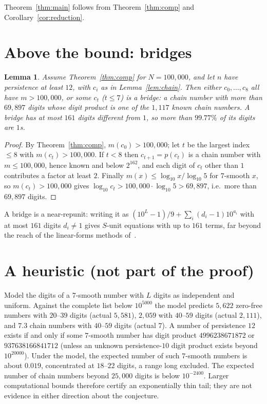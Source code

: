 \documentclass[11pt]{article}
\newtheorem{lemma}[theorem]{Lemma}
\theoremstyle{definition}
\newcommand{\NB}{100{,}000}
\begin{document}
Theorem~\ref{thm:main} follows from Theorem~\ref{thm:comp} and Corollary~\ref{cor:reduction}.

\section{Above the bound: bridges}\label{sec:bridges}

\begin{lemma}\label{lem:bridge}
Assume Theorem~\ref{thm:comp} for $N=\NB$, and let $n$ have persistence at least $12$, with $c_i$ as in
Lemma~\ref{lem:chain}. Then either $c_0,\dots,c_8$ all have $m>\NB$, or some $c_t$ ($t\le7$) is a \emph{bridge}: a chain
number with more than $69{,}897$ digits whose digit product is one of the $1{,}117$ known chain numbers. A bridge has
at most $161$ digits different from $1$, so more than $99.77\%$ of its digits are $1$s.
\end{lemma}

\begin{proof}
By Theorem~\ref{thm:comp}, $m(c_0)>\NB$; let $t$ be the largest index $\le8$ with $m(c_t)>\NB$. If $t<8$ then
$c_{t+1}=p(c_t)$ is a chain number with $m\le\NB$, hence known and below $2^{162}$, and each digit of $c_t$ other than
$1$ contributes a factor at least $2$. Finally $m(x)\le\log_{10}x/\log_{10}5$ for $7$-smooth $x$, so
$m(c_t)>\NB$ gives $\log_{10}c_t>\NB\cdot\log_{10}5>69{,}897$, i.e.\ more than $69{,}897$ digits.
\end{proof}

A bridge is a near-repunit: writing it as $(10^L-1)/9+\sum_i (d_i-1)10^{a_i}$ with at most $161$ digits $d_i\neq1$
gives $S$-unit equations with up to $161$ terms, far beyond the reach of the linear-forms methods
of~\cite{bcgn,fonga}.

\section{A heuristic (not part of the proof)}\label{sec:heuristic}

Model the digits of a $7$-smooth number with $L$ digits as independent and uniform. Against the complete list below
$10^{5000}$ the model predicts $5{,}622$ zero-free numbers with $20$--$39$ digits (actual $5{,}581$), $2{,}059$ with $40$--$59$
digits (actual $2{,}111$), and $7.3$ chain numbers with $40$--$59$ digits (actual $7$). A number of persistence $12$
exists if and only if some $7$-smooth number has digit product $4996238671872$ or $937638166841712$ (unless an unknown
persistence-$10$ digit product exists beyond $10^{20000}$). Under the model, the expected number of such $7$-smooth
numbers is about $0.019$, concentrated at $18$--$22$ digits, a range long excluded. The expected number of chain numbers
beyond $25{,}000$ digits is below $10^{-2400}$. Larger computational bounds therefore certify an exponentially thin tail;
they are not evidence in either direction about the conjecture.
\end{document}
